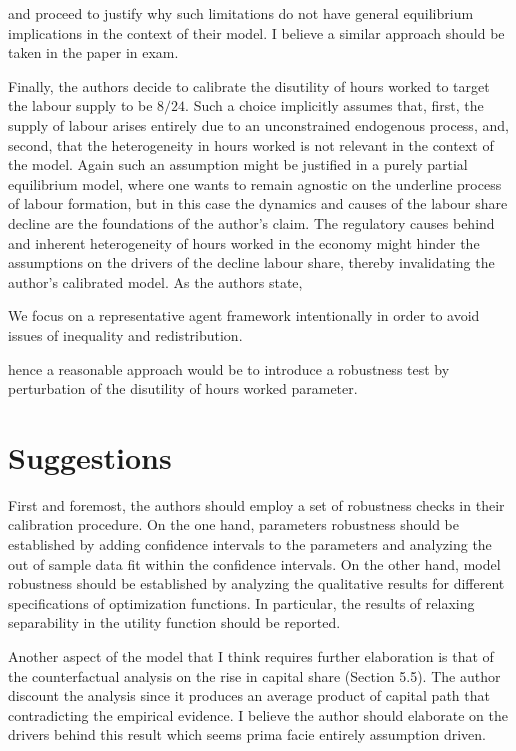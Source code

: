 \documentclass[american]{scrartcl}
\begin{document}
and proceed to justify why such limitations do not have general equilibrium implications in the context of their model. I believe a similar approach should be taken in the paper in exam.

Finally, the authors decide to calibrate the disutility of hours worked to target the labour supply to be $8/24$. Such a choice implicitly assumes that, first, the supply of labour arises entirely due to an unconstrained endogenous process, and, second, that the heterogeneity in hours worked is not relevant in the context of the model. Again such an assumption might be justified in a purely partial equilibrium model, where one wants to remain agnostic on the underline process of labour formation, but in this case the dynamics and causes of the labour share decline are the foundations of the author's claim. The regulatory causes behind and inherent heterogeneity of hours worked in the economy might hinder the assumptions on the drivers of the decline labour share, thereby invalidating the author's calibrated model. As the authors state,

\begin{displayquote}[p. 3][]
    We focus on a representative agent framework intentionally in order to avoid issues of inequality and redistribution.
\end{displayquote}

hence a reasonable approach would be to introduce a robustness test by perturbation of the disutility of hours worked parameter.

\section{Suggestions}

First and foremost, the authors should employ a set of robustness checks in their calibration procedure. On the one hand, parameters robustness should be established by adding confidence intervals to the parameters and analyzing the out of sample data fit within the confidence intervals. On the other hand, model robustness should be established by analyzing the qualitative results for different specifications of optimization functions. In particular, the results of relaxing separability in the utility function should be reported.

Another aspect of the model that I think requires further elaboration is that of the counterfactual analysis on the rise in capital share (Section 5.5). The author discount the analysis since it produces an average product of capital path that contradicting the empirical evidence. I believe the author should elaborate on the drivers behind this result which seems prima facie entirely assumption driven.
\end{document}

